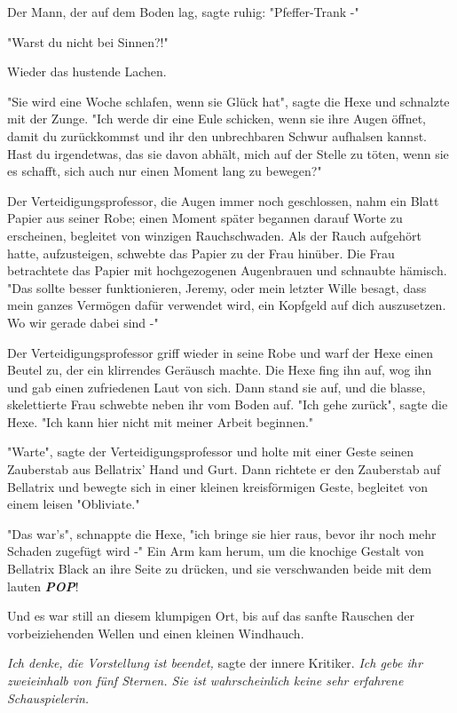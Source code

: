 {Der Mann, der auf dem Boden lag, sagte ruhig: "Pfeffer-Trank -"

"Warst du nicht bei Sinnen?!"

Wieder das hustende Lachen.

"Sie wird eine Woche schlafen, wenn sie Glück hat", sagte die Hexe und schnalzte mit der Zunge. "Ich werde dir eine Eule schicken, wenn sie ihre Augen öffnet, damit du zurückkommst und ihr den unbrechbaren Schwur aufhalsen kannst. Hast du irgendetwas, das sie davon abhält, mich auf der Stelle zu töten, wenn sie es schafft, sich auch nur einen Moment lang zu bewegen?"

Der Verteidigungsprofessor, die Augen immer noch geschlossen, nahm ein Blatt Papier aus seiner Robe; einen Moment später begannen darauf Worte zu erscheinen, begleitet von winzigen Rauchschwaden. Als der Rauch aufgehört hatte, aufzusteigen, schwebte das Papier zu der Frau hinüber. Die Frau betrachtete das Papier mit hochgezogenen Augenbrauen und schnaubte hämisch. "Das sollte besser funktionieren, Jeremy, oder mein letzter Wille besagt, dass mein ganzes Vermögen dafür verwendet wird, ein Kopfgeld auf dich auszusetzen. Wo wir gerade dabei sind -"

Der Verteidigungsprofessor griff wieder in seine Robe und warf der Hexe einen Beutel zu, der ein klirrendes Geräusch machte. Die Hexe fing ihn auf, wog ihn und gab einen zufriedenen Laut von sich. Dann stand sie auf, und die blasse, skelettierte Frau schwebte neben ihr vom Boden auf. "Ich gehe zurück", sagte die Hexe. "Ich kann hier nicht mit meiner Arbeit beginnen."

"Warte", sagte der Verteidigungsprofessor und holte mit einer Geste seinen Zauberstab aus Bellatrix' Hand und Gurt. Dann richtete er den Zauberstab auf Bellatrix und bewegte sich in einer kleinen kreisförmigen Geste, begleitet von einem leisen "Obliviate."

"Das war's", schnappte die Hexe, "ich bringe sie hier raus, bevor ihr noch mehr Schaden zugefügt wird -" Ein Arm kam herum, um die knochige Gestalt von Bellatrix Black an ihre Seite zu drücken, und sie verschwanden beide mit dem lauten \textbf{\emph{POP}}!

Und es war still an diesem klumpigen Ort, bis auf das sanfte Rauschen der vorbeiziehenden Wellen und einen kleinen Windhauch.

\emph{Ich denke, die Vorstellung ist beendet,} sagte der innere Kritiker. \emph{Ich gebe ihr zweieinhalb von fünf Sternen. Sie ist wahrscheinlich keine sehr erfahrene Schauspielerin.}

}
